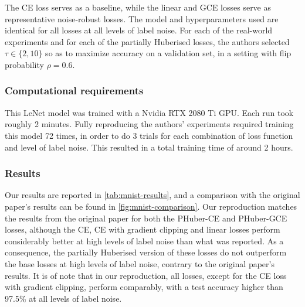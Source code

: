 The CE loss serves as a baseline, while the linear and GCE losses serve as representative noise-robust losses. 
The model and hyperparameters used are identical for all losses at all levels of label noise. For each of the real-world experiments and for each of the partially Huberised losses, the authors selected $\tau \in \{2, 10\}$ so as to maximize accuracy on a validation set, in a setting with flip probability $\rho = 0.6$. 


\subsubsection{Computational requirements} 
This LeNet model was trained with a Nvidia RTX 2080 Ti GPU. Each run took roughly 2 minutes. Fully reproducing the authors' experiments required training this model 72 times, in order to do 3 trials for each combination of loss function and level of label noise. This resulted in a total training time of around 2 hours.

\subsubsection{Results}

Our results are reported in \autoref{tab:mnist-results}, and a comparison with the original paper's results can be found in \autoref{fig:mnist-comparison}. 
Our reproduction matches the results from the original paper for both the PHuber-CE and PHuber-GCE losses, although the CE, CE with gradient clipping and linear losses perform considerably better at high levels of label noise than what was reported. As a consequence, the partially Huberised version of these losses do not outperform the base losses at high levels of label noise, contrary to the original paper's results. It is of note that in our reproduction, all losses, except for the CE loss with gradient clipping, perform comparably, with a test accuracy higher than 97.5\% at all levels of label noise.

